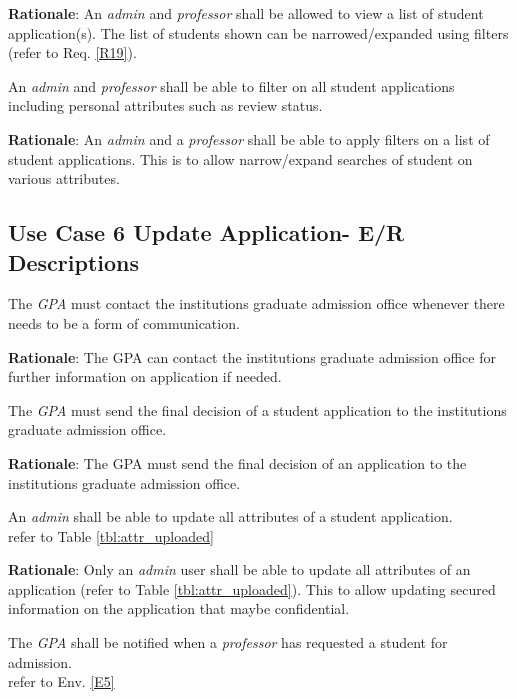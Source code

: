 \documentclass[fontsize=12pt,paper=letter,twoside]{scrartcl}
\begin{document}
\smallskip
\noindent \textbf{Rationale}: An \emph{admin} and \emph{professor} shall be allowed to view a list of student application(s). The list of students shown can be narrowed/expanded using filters (refer to Req. \ref{R19}).

\genreq
{An \emph{admin} and \emph{professor} shall be able to filter on all student applications including personal attributes such as review status.\\}
{}
\label{R19}

\smallskip
\noindent \textbf{Rationale}: An \emph{admin} and a \emph{professor} shall be able to apply filters on a list of student applications. This is to allow narrow/expand searches of student on various attributes.

\subsection{Use Case 6 Update Application- E/R Descriptions}

\genenv
{The \emph{GPA} must contact the institutions graduate admission office whenever there needs to be a form of communication. \\}
{}
\label{E4}

\smallskip
\noindent \textbf{Rationale}: The GPA can contact the institutions graduate admission office for further information on application if needed.

\genenv
{The \emph{GPA} must send the final decision of a student application to the institutions graduate admission office. \\}
{}
\label{E5}

\smallskip
\noindent \textbf{Rationale}: The GPA must send the final decision of an application to the institutions graduate admission office.

\rdescription
{An \emph{admin} shall be able to update all attributes of a student application.\\}
{refer to Table \ref{tbl:attr_uploaded}}
\label{R20}

\smallskip
\noindent \textbf{Rationale}: Only an \emph{admin} user shall be able to update all attributes of an application (refer to Table \ref{tbl:attr_uploaded}). This to allow updating secured information on the application that maybe confidential.

\rdescription
{The \emph{GPA} shall be notified when a \emph{professor} has requested a student for admission.\\}
{refer to Env. \ref{E5}}
\label{R21}
\end{document}
